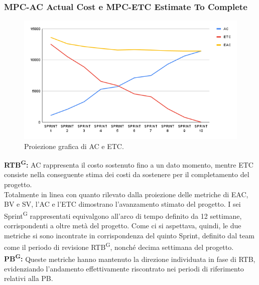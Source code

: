 \documentclass[8pt]{article}
\newcommand{\glossterm}[1]{#1\textsuperscript{G}} %
\begin{document}
\subsubsection{MPC-AC Actual Cost e MPC-ETC Estimate To Complete}
\begin{figure}[h!]
    \centering
    \includegraphics[width=1\textwidth]{images_pdq/ETC_AC.png}
    \caption{Proiezione grafica di AC e ETC.}
    \label{fig:Proiezione grafica di AC e ETC}
\end{figure}
\textbf{\glossterm{RTB}:} AC rappresenta il costo sostenuto fino a un dato momento, mentre ETC consiste nella conseguente stima dei costi da sostenere per il completamento del progetto.\\
Totalmente in linea con quanto rilevato dalla proiezione delle metriche di EAC, BV e SV, l'AC e l'ETC dimostrano l'avanzamento stimato del progetto. I sei \glossterm{Sprint} rappresentati equivalgono all'arco di tempo definito da 12 settimane, corrispondenti a oltre metà del progetto. Come ci si aspettava, quindi, le due metriche si sono incontrate in corrispondenza del quinto Sprint, definito dal team come il periodo di revisione \glossterm{RTB}, nonché decima settimana del progetto.\\
\textbf{\glossterm{PB}:} Queste metriche hanno mantenuto la direzione individuata 
in fase di RTB, evidenziando l'andamento effettivamente riscontrato nei periodi di riferimento relativi alla PB.
\clearpage
\end{document}

